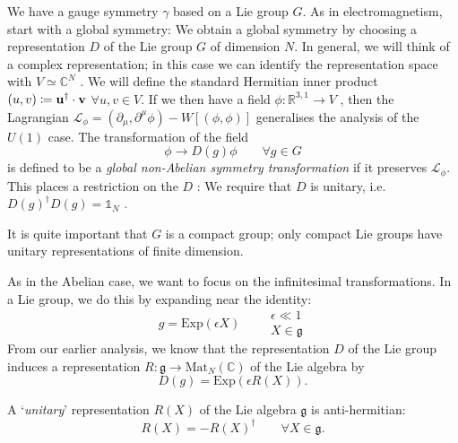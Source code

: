 We have a gauge symmetry $\gamma$ based on a Lie group  $G$.
As in electromagnetism, start with a global symmetry:
We obtain a global symmetry by choosing a representation  $D$  of the Lie group $G$  of dimension $N$.
In general, we will think of a complex representation; in this case we can identify the representation space with  $V \simeq \mathbb{C}^N$ .
We will define the standard Hermitian inner product $(u, v) \coloneqq \vb{u}^{\dagger} \cdot \vb{v}$ $\forall u, v \in V$.
If we then have a field  $\phi \colon \mathbb{R}^{3, 1} \to V$ , then the Lagrangian $\mathcal{L}_\phi = (\partial_{\mu}, \partial^{\mu} \phi) - W [(\phi, \phi)]$  generalises the analysis of the $U(1)$  case.
The transformation of the field 
\begin{equation}
  \label{eq:24-non-abel-sym-trans}
  \phi \to D(g) \phi \qquad \forall g \in G
\end{equation}
is defined to be a  \emph{global non-Abelian symmetry transformation} if it preserves $\mathcal{L}_\phi$.
This places a restriction on the $D$ : We require that $D$  is unitary, i.e.~$D(g)^{\dagger} D(g) = \mathbb{1}_N$ .

It is quite important that $G$  is a compact group; only compact Lie groups have unitary representations of finite dimension.

As in the Abelian case, we want to focus on the infinitesimal transformations. In a Lie group, we do this by expanding near the identity:
\begin{equation}
  g = \text{Exp}(\epsilon X) \qquad
  \begin{gathered}
    \epsilon \ll 1 \\
    X \in \mathfrak{g}
  \end{gathered}
\end{equation}
From our earlier analysis, we know that the representation $D$ of the Lie group induces a representation $R \colon \mathfrak{g} \to \text{Mat}_N(\mathbb{C})$ of the Lie algebra by
\begin{equation}
  D(g) = \text{Exp}(\epsilon R(X)).
\end{equation}

\begin{definition}[]
  A `\emph{unitary}' representation $R(X)$ of the Lie algebra $\mathfrak{g}$ is anti-hermitian:
  \begin{equation}
    R(X) = - R(X)^{\dagger} \qquad \forall X \in \mathfrak{g}.
  \end{equation}
\end{definition} 

